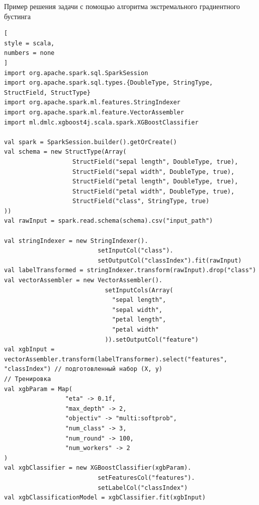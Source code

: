 \documentclass[%
	11pt,
	a4paper,
	utf8,
		]{article}
\begin{document}
Пример решения задачи с помощью алгоритма экстремального градиентного бустинга
\begin{lstlisting}[
style = scala,
numbers = none	
]
import org.apache.spark.sql.SparkSession
import org.apache.spark.sql.types.{DoubleType, StringType, StructField, StructType}
import org.apache.spark.ml.features.StringIndexer
import org.apache.spark.ml.feature.VectorAssembler
import ml.dmlc.xgboost4j.scala.spark.XGBoostClassifier

val spark = SparkSession.builder().getOrCreate()
val schema = new StructType(Array(
                   StructField("sepal length", DoubleType, true),
                   StructField("sepal width", DoubleType, true),
                   StructField("petal length", DoubleType, true),
                   StructField("petal width", DoubleType, true),
                   StructField("class", StringType, true)
))
val rawInput = spark.read.schema(schema).csv("input_path")

val stringIndexer = new StringIndexer().
                          setInputCol("class").
                          setOutputCol("classIndex").fit(rawInput)
val labelTransformed = stringIndexer.transform(rawInput).drop("class")
val vectorAssembler = new VectorAssembler().
                            setInputCols(Array(
                              "sepal length",
                              "sepal width",
                              "petal length",
                              "petal width"
                            )).setOutputCol("feature")
val xgbInput = vectorAssembler.transform(labelTransformer).select("features", "classIndex") // подготовленный набор (X, y)
// Тренировка
val xgbParam = Map(
                 "eta" -> 0.1f,
                 "max_depth" -> 2,
                 "objectiv" -> "multi:softprob",
                 "num_class" -> 3,
                 "num_round" -> 100,
                 "num_workers" -> 2
)
val xgbClassifier = new XGBoostClassifier(xgbParam).
                          setFeaturesCol("features").
                          setLabelCol("classIndex")
val xgbClassificationModel = xgbClassifier.fit(xgbInput)
\end{lstlisting}
\end{document}
